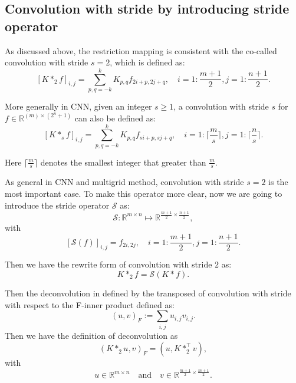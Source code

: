 \subsection{Convolution with stride by introducing stride operator}
As discussed above, the restriction mapping is consistent with the 
co-called convolution with stride $s=2$, which is defined as:
\begin{equation}\label{stride_2}
[K \ast_2 f]_{i,j} = \sum_{p,q=-k}^k K_{p,q} f_{2i + p, 2j + q},  
\quad i = 1: \frac{m+1}{2} , j = 1: \frac{n+1}{2}.
\end{equation}


\begin{remark}
More generally in CNN, given an integer $s\ge1$, a convolution with stride $s$ for $f \in \mathbb{R}^{(m)\times
		(2^n+1)}$ can also be defined as:
	\begin{equation}\label{stride}
	[K \ast_s f]_{i,j} = \sum_{p,q=-k}^k K_{p,q} f_{si + p, sj + q},  
	\quad i = 1: \lceil  \frac{m}{s}\rceil , j = 1: \lceil  \frac{n}{s}\rceil.
	\end{equation}
	
	Here $ \lceil  \frac{m}{s}\rceil$ denotes the smallest integer that greater than $\frac{m}{s}$.
\end{remark}

As general in CNN and multigrid method, convolution with stride $s=2$ is the most important case.
To make this operator more clear, now we are going to introduce the stride operator $\mathcal S$ as:
\begin{equation}\label{eq:strideopdim}
\mathcal S: \mathbb{R}^{m \times n} \mapsto \mathbb{R}^{\frac{m+1}{2} \times \frac{n+1}{2}},
\end{equation}
with
\begin{equation}\label{eq:strideop}
[\mathcal S(f)]_{i,j} = f_{2i, 2j}, \quad i  = 1:\frac{m+1}{2}, j = 1:\frac{n+1}{2}.
\end{equation}

Then we have the rewrite form of convolution with stride $2$ as:
\begin{equation}\label{eq:convstride_2_1}
K \ast_2 f = \mathcal S( K\ast f).
\end{equation}


Then the deconvolution in defined by the transposed of convolution 
with stride with respect to the F-inner product defined as:
$$
(u, v)_F := \sum_{i,j} u_{i,j}v_{i,j}.
$$
Then we have the definition of deconvolution as
\begin{equation}\label{eq:def_deconv}
(K \ast_2 u, v)_F = (u, K \ast_2^\top v),
\end{equation}
with
\begin{equation}
u \in \mathbb{R}^{m \times n} \quad \text{and} \quad v \in \mathbb{R}^{\frac{m+1}{2} \times \frac{m+1}{2}}.
\end{equation}

